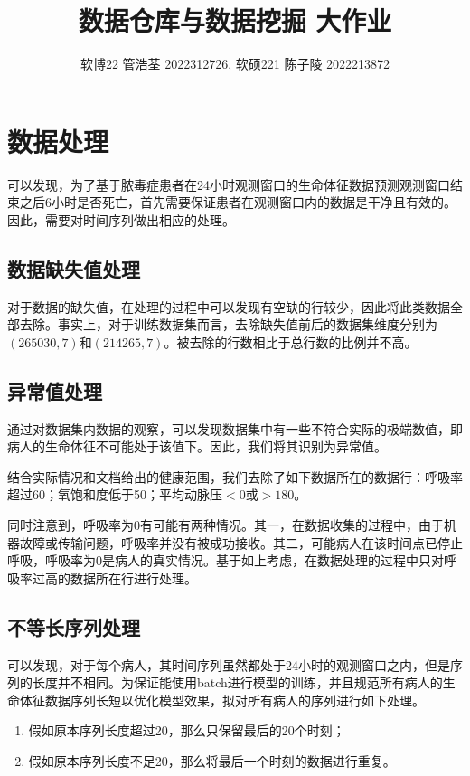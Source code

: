 \documentclass[UTF8]{article}
\title{\vspace{-5em}数据仓库与数据挖掘 大作业}
\author{\vspace{-5em}软博22 管浩荃 2022312726, 软硕221 陈子陵 2022213872}
\date{}
\begin{document}
\maketitle
\section{数据处理}
可以发现，为了基于脓毒症患者在24小时观测窗口的生命体征数据预测观测窗口结束之后6小时是否死亡，首先需要保证患者在观测窗口内的数据是干净且有效的。因此，需要对时间序列做出相应的处理。

\subsection{数据缺失值处理}
对于数据的缺失值，在处理的过程中可以发现有空缺的行较少，因此将此类数据全部去除。事实上，对于训练数据集而言，去除缺失值前后的数据集维度分别为$(265030,7)$和$(214265,7)$。被去除的行数相比于总行数的比例并不高。

\subsection{异常值处理}
通过对数据集内数据的观察，可以发现数据集中有一些不符合实际的极端数值，即病人的生命体征不可能处于该值下。因此，我们将其识别为异常值。

结合实际情况和文档给出的健康范围，我们去除了如下数据所在的数据行：呼吸率超过60；氧饱和度低于50；平均动脉压$<0$或$>180$。

同时注意到，呼吸率为$0$有可能有两种情况。其一，在数据收集的过程中，由于机器故障或传输问题，呼吸率并没有被成功接收。其二，可能病人在该时间点已停止呼吸，呼吸率为$0$是病人的真实情况。基于如上考虑，在数据处理的过程中只对呼吸率过高的数据所在行进行处理。

\subsection{不等长序列处理}\label{subsect:icd9}
可以发现，对于每个病人，其时间序列虽然都处于24小时的观测窗口之内，但是序列的长度并不相同。为保证能使用batch进行模型的训练，并且规范所有病人的生命体征数据序列长短以优化模型效果，拟对所有病人的序列进行如下处理。

\begin{enumerate}
    \item 假如原本序列长度超过20，那么只保留最后的20个时刻；
    \item 假如原本序列长度不足20，那么将最后一个时刻的数据进行重复。
\end{enumerate}
\end{document}
